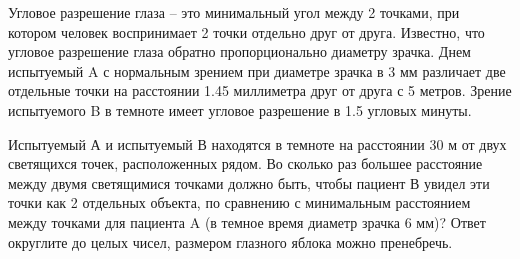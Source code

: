 
Угловое
разрешение глаза – это минимальный угол между 2 точками, при котором человек
воспринимает 2 точки отдельно друг от друга. Известно, что угловое разрешение
глаза обратно пропорционально диаметру зрачка. Днем испытуемый A с нормальным
зрением при диаметре зрачка в 3  мм различает две отдельные точки на расстоянии
1.45 миллиметра друг от друга с 5  метров. Зрение испытуемого B в темноте имеет
угловое разрешение в 1.5 угловых минуты. 

Испытуемый А и испытуемый В находятся в темноте на расстоянии 
30 м от двух светящихся точек, расположенных рядом.  Во сколько раз большее расстояние между двумя
светящимися точками должно быть, чтобы пациент В увидел эти точки как 2
отдельных объекта, по сравнению с минимальным расстоянием между точками для
пациента A (в темное время диаметр зрачка 6 мм)? Ответ округлите до целых
чисел, размером глазного яблока можно пренебречь.

